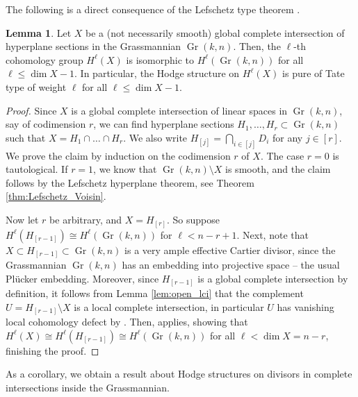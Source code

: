 \documentclass[12pt]{extarticle}
\theoremstyle{definition}
\theoremstyle{theorem}
\newtheorem{lemma}[definition]{Lemma}
\theoremstyle{remark}
\numberwithin{equation}{section}
\DeclareMathOperator{\gr}{Gr}
\begin{document}
The following is a direct consequence of the Lefschetz type theorem \cite[Theorem B]{popa_lefschetz}.
\begin{lemma}\label{lem:CI_Hodge}
    Let $X$ be a (not necessarily smooth) global complete intersection of hyperplane sections in the Grassmannian $\gr(k,n)$.
    Then, the $\ell$-th cohomology group $H^\ell(X)$ is isomorphic to $H^\ell(\gr(k,n))$ for all $\ell\leq \dim X-1$. In particular, the Hodge structure on $H^\ell(X)$ is pure of Tate type of weight $\ell$ for all $\ell\leq \dim X -1$.
\end{lemma}
\begin{proof}
    Since $X$ is a global complete intersection of linear spaces in $\gr(k,n)$, say of codimension $r$, we can find hyperplane sections $H_1,\ldots,H_r\subset \gr(k,n)$ such that $X=H_1\cap\ldots \cap H_r$. 
    We also write $H_{[j]}=\bigcap_{i\in [j]}D_i$ for any $j\in [r]$.
    We prove the claim by induction on the codimension $r$ of $X$.
    The case $r=0$ is tautological.
    If $r =1$, we know that $\gr(k,n)\setminus X$ is smooth, and the claim follows by the Lefschetz hyperplane theorem, see Theorem \ref{thm:Lefschetz_Voisin}.
    
    Now let $r$ be arbitrary, and $X=H_{[r]}$.
    So suppose $H^\ell(H_{[r-1]})\cong H^\ell(\gr(k,n))$ for $\ell<n-r+1$.
    Next, note that $X \subset H_{[r-1]}\subset \gr(k,n)$ is a very ample effective Cartier divisor, since the Grassmannian $\gr(k,n)$ has an embedding into projective space  -- the usual Pl\"ucker embedding.
    Moreover, since $H_{[r-1]}$ is a global complete intersection by definition, it follows from Lemma \ref{lem:open_lci} that the complement $U=H_{[r-1]}\setminus X$ is a local complete intersection, in particular $U$ has vanishing local cohomology defect by \cite[Example 2.5]{popa_lefschetz}.
    Then, \cite[Theorem B]{popa_lefschetz} applies, showing that $H^\ell(X)\cong H^\ell(H_{[r-1]})\cong H^\ell(\gr(k,n))$ for all $\ell<\dim X=n-r$, finishing the proof.
\end{proof}

As a corollary, we obtain a result about Hodge structures on divisors in complete intersections inside the Grassmannian.
\end{document}
